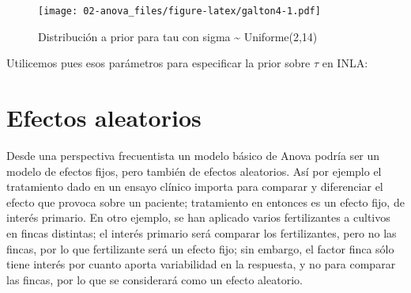 \documentclass[
]{book}
\newenvironment{Shaded}{\begin{snugshade}}{\end{snugshade}}
\newcommand{\AttributeTok}[1]{\textcolor[rgb]{0.77,0.63,0.00}{#1}}
\newcommand{\CommentTok}[1]{\textcolor[rgb]{0.56,0.35,0.01}{\textit{#1}}}
\newcommand{\DecValTok}[1]{\textcolor[rgb]{0.00,0.00,0.81}{#1}}
\newcommand{\FunctionTok}[1]{\textcolor[rgb]{0.00,0.00,0.00}{#1}}
\newcommand{\NormalTok}[1]{#1}
\newcommand{\OtherTok}[1]{\textcolor[rgb]{0.56,0.35,0.01}{#1}}
\newcommand{\SpecialCharTok}[1]{\textcolor[rgb]{0.00,0.00,0.00}{#1}}
\newcommand{\StringTok}[1]{\textcolor[rgb]{0.31,0.60,0.02}{#1}}
\begin{document}
\begin{figure}
\centering
\texttt{[image: 02-anova\_files/figure-latex/galton4-1.pdf]}
\caption{\label{fig:galton4}Distribución a prior para tau con sigma \textasciitilde{} Uniforme(2,14)}
\end{figure}

Utilicemos pues esos parámetros para especificar la prior sobre \(\tau\) en INLA:

\begin{Shaded}
\end{Shaded}

\hypertarget{efectos-aleatorios}{%
\section{Efectos aleatorios}\label{efectos-aleatorios}}

Desde una perspectiva frecuentista un modelo básico de Anova podría ser un modelo de efectos fijos, pero también de efectos aleatorios. Así por ejemplo el tratamiento dado en un ensayo clínico importa para comparar y diferenciar el efecto que provoca sobre un paciente; tratamiento en entonces es un efecto fijo, de interés primario. En otro ejemplo, se han aplicado varios fertilizantes a cultivos en fincas distintas; el interés primario será comparar los fertilizantes, pero no las fincas, por lo que fertilizante será un efecto fijo; sin embargo, el factor finca sólo tiene interés por cuanto aporta variabilidad en la respuesta, y no para comparar las fincas, por lo que se considerará como un efecto aleatorio.
\end{document}

